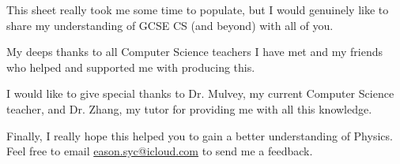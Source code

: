 \documentclass[8pt]{article}
\theoremstyle{remark}
\begin{document}
        This sheet really took me some time to populate, but I would genuinely like to share my understanding of GCSE CS (and beyond) with all of you.
        
        My deeps thanks to all Computer Science teachers I have met and my friends who helped and supported me with producing this.
        
        I would like to give special thanks to Dr. Mulvey, my current Computer Science teacher, and Dr. Zhang, my tutor for providing me with all this knowledge.

        Finally, I really hope this helped you to gain a better understanding of Physics. Feel free to email \href{eason.syc@icloud.com}{eason.syc@icloud.com} to send me a feedback.
\end{document}
